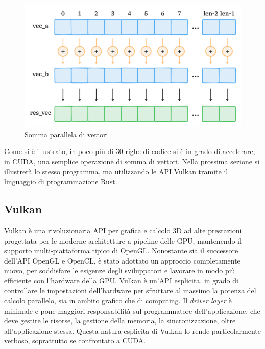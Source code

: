 \begin{figure}[ht]
    \centering
    \includegraphics[width=.9\linewidth]{images/chapter2/sum_vec.png}
    \caption{Somma parallela di vettori}
    \label{fig:sum_vec}
\end{figure}

Come si è illustrato, in poco più di 30 righe di codice si è in grado di accelerare, in \gls{CUDA}, una semplice operazione di somma di vettori. Nella prossima sezione si illustrerà lo stesso programma, ma utilizzando le \gls{API} Vulkan tramite il linguaggio di programmazione Rust.

\subsection[Vulkan]{Vulkan}

Vulkan è una rivoluzionaria \gls{API} per grafica e calcolo 3D ad alte prestazioni progettata per le moderne architetture a pipeline delle \gls{GPU}, mantenendo il supporto multi-piattaforma tipico di OpenGL. Nonostante sia il successore dell'\gls{API} OpenGL e OpenCL, è stato adottato un approccio completamente nuovo, per soddisfare le esigenze degli sviluppatori e lavorare in modo più efficiente con l'hardware della \gls{GPU}. Vulkan è un'\gls{API} esplicita, in grado di controllare le impostazioni dell'hardware per sfruttare al massimo la potenza del calcolo parallelo, sia in ambito grafico che di computing. Il \textit{driver layer} è minimale e pone maggiori responsabilità sul programmatore dell'applicazione, che deve gestire le risorse, la gestione della memoria, la sincronizzazione, oltre all'applicazione stessa. Questa natura esplicita di Vulkan lo rende particolarmente verboso, soprattutto se confrontato a \gls{CUDA}.

